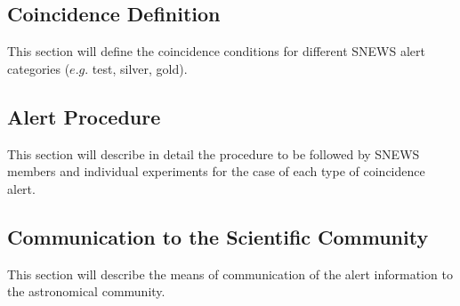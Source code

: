 \documentclass{article}
\begin{document}
\subsection{Coincidence Definition}

This section will define the coincidence conditions for different
SNEWS alert categories ($e.g.$ test, silver, gold).

\subsection{Alert Procedure}

This section will describe in detail the procedure to be followed by
SNEWS members and individual experiments for the case of each type of
coincidence alert.

\subsection{Communication to the Scientific Community}

This section will describe the means of communication
of the alert information to the astronomical community.
\end{document}
